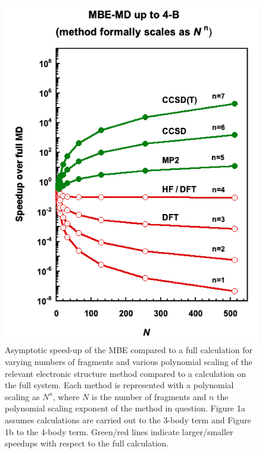 \begin{figure}[t]
\begin{center}
\begin{minipage}{0.4\textwidth}
\includegraphics[width=\textwidth]{Figures/Chapter_4/ch4_figure_1_right.png}
\end{minipage}
\end{center}
\begin{spacing}{1.0}
\caption[Asymptotic speed-up of the MBE compared to a full calculation for varying numbers of fragments and various polynomial scaling of the relevant electronic structure method compared to a calculation on the full system. Each method is represented with a polynomial scaling as $N^n$, where $N$ is the number of fragments and $n$ the polynomial scaling exponent of the method in question.]{Asymptotic speed-up of the MBE compared to a full calculation for varying numbers of fragments and various polynomial scaling of the relevant electronic structure method compared to a calculation on the full system. Each method is represented with a polynomial scaling as $N^n$, where $N$ is the number of fragments and $n$ the polynomial scaling exponent of the method in question. Figure 1a assumes calculations are carried out to the 3-body term and Figure 1b to the 4-body term. Green/red lines indicate larger/smaller speedups with respect to the full calculation.}\label{fig:MBE_MD_F1}
\end{spacing}
\end{figure}
